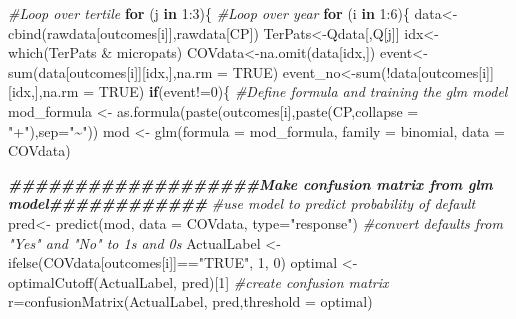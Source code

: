 \documentclass[
]{article}
\newenvironment{Shaded}{\begin{snugshade}}{\end{snugshade}}
\newcommand{\AttributeTok}[1]{\textcolor[rgb]{0.77,0.63,0.00}{#1}}
\newcommand{\CommentTok}[1]{\textcolor[rgb]{0.56,0.35,0.01}{\textit{#1}}}
\newcommand{\ConstantTok}[1]{\textcolor[rgb]{0.00,0.00,0.00}{#1}}
\newcommand{\ControlFlowTok}[1]{\textcolor[rgb]{0.13,0.29,0.53}{\textbf{#1}}}
\newcommand{\DecValTok}[1]{\textcolor[rgb]{0.00,0.00,0.81}{#1}}
\newcommand{\DocumentationTok}[1]{\textcolor[rgb]{0.56,0.35,0.01}{\textbf{\textit{#1}}}}
\newcommand{\FunctionTok}[1]{\textcolor[rgb]{0.00,0.00,0.00}{#1}}
\newcommand{\NormalTok}[1]{#1}
\newcommand{\OtherTok}[1]{\textcolor[rgb]{0.56,0.35,0.01}{#1}}
\newcommand{\SpecialCharTok}[1]{\textcolor[rgb]{0.00,0.00,0.00}{#1}}
\newcommand{\StringTok}[1]{\textcolor[rgb]{0.31,0.60,0.02}{#1}}
\begin{document}
\begin{Shaded}
\begin{Highlighting}[]
\CommentTok{\#Loop over tertile}
\ControlFlowTok{for}\NormalTok{ (j }\ControlFlowTok{in} \DecValTok{1}\SpecialCharTok{:}\DecValTok{3}\NormalTok{)\{}
  \CommentTok{\#Loop over year}
  \ControlFlowTok{for}\NormalTok{ (i }\ControlFlowTok{in} \DecValTok{1}\SpecialCharTok{:}\DecValTok{6}\NormalTok{)\{}
\NormalTok{    data}\OtherTok{\textless{}{-}}\FunctionTok{cbind}\NormalTok{(rawdata[outcomes[i]],rawdata[CP])}
\NormalTok{    TerPats}\OtherTok{\textless{}{-}}\NormalTok{Qdata[,Q[j]]}
\NormalTok{    idx}\OtherTok{\textless{}{-}}\FunctionTok{which}\NormalTok{(TerPats }\SpecialCharTok{\&}\NormalTok{ micropats)}
\NormalTok{    COVdata}\OtherTok{\textless{}{-}}\FunctionTok{na.omit}\NormalTok{(data[idx,])}
\NormalTok{    event}\OtherTok{\textless{}{-}}\FunctionTok{sum}\NormalTok{(data[outcomes[i]][idx,],}\AttributeTok{na.rm =} \ConstantTok{TRUE}\NormalTok{)}
\NormalTok{    event\_no}\OtherTok{\textless{}{-}}\FunctionTok{sum}\NormalTok{(}\SpecialCharTok{!}\NormalTok{data[outcomes[i]][idx,],}\AttributeTok{na.rm =} \ConstantTok{TRUE}\NormalTok{)}
    \ControlFlowTok{if}\NormalTok{(event}\SpecialCharTok{!=}\DecValTok{0}\NormalTok{)\{}
    \CommentTok{\#Define formula and training the glm model}
\NormalTok{    mod\_formula }\OtherTok{\textless{}{-}} \FunctionTok{as.formula}\NormalTok{(}\FunctionTok{paste}\NormalTok{(outcomes[i],}\FunctionTok{paste}\NormalTok{(CP,}\AttributeTok{collapse =} \StringTok{"+"}\NormalTok{),}\AttributeTok{sep=}\StringTok{"\textasciitilde{}"}\NormalTok{))}
\NormalTok{    mod }\OtherTok{\textless{}{-}} \FunctionTok{glm}\NormalTok{(}\AttributeTok{formula =}\NormalTok{ mod\_formula, }\AttributeTok{family =}\NormalTok{ binomial, }\AttributeTok{data =}\NormalTok{ COVdata)}
  
  
    \DocumentationTok{\#\#\#\#\#\#\#\#\#\#\#\#\#\#\#\#\#\#\#Make confusion matrix from glm model\#\#\#\#\#\#\#\#\#\#\#\#}
    \CommentTok{\#use model to predict probability of default}
\NormalTok{    pred}\OtherTok{\textless{}{-}} \FunctionTok{predict}\NormalTok{(mod, }\AttributeTok{data =}\NormalTok{ COVdata, }\AttributeTok{type=}\StringTok{"response"}\NormalTok{)}
    \CommentTok{\#convert defaults from "Yes" and "No" to 1\textquotesingle{}s and 0\textquotesingle{}s}
\NormalTok{    ActualLabel }\OtherTok{\textless{}{-}} \FunctionTok{ifelse}\NormalTok{(COVdata[outcomes[i]]}\SpecialCharTok{==}\StringTok{"TRUE"}\NormalTok{, }\DecValTok{1}\NormalTok{, }\DecValTok{0}\NormalTok{)}
\NormalTok{    optimal }\OtherTok{\textless{}{-}} \FunctionTok{optimalCutoff}\NormalTok{(ActualLabel, pred)[}\DecValTok{1}\NormalTok{]}
    \CommentTok{\#create confusion matrix}
\NormalTok{    r}\OtherTok{=}\FunctionTok{confusionMatrix}\NormalTok{(ActualLabel, pred,}\AttributeTok{threshold =}\NormalTok{ optimal)}
  

\end{Highlighting}
\end{Shaded}
\end{document}
